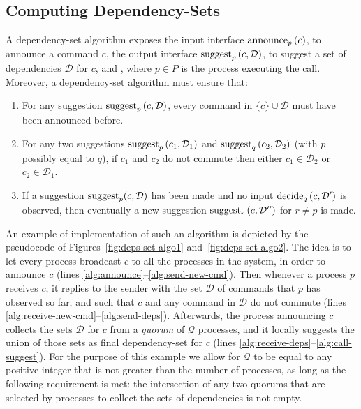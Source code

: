 

\subsection{Computing Dependency-Sets}
\label{dep-algo}


A dependency-set algorithm exposes the input interface $\operatorname{announce}_p\left( c \right)$, to announce a command $c$, the output interface $\operatorname{suggest}_p \left( c,\mathcal{D}\right)$, to suggest a set of dependencies $\mathcal{D}$ for $c$, and , where $p\in P$ is the process executing the call.
Moreover, a dependency-set algorithm must ensure that:
\begin{enumerate}
    \item For any suggestion $\operatorname{suggest}_p \left( c,\mathcal{D}\right)$, every command in $\{c\}\cup \mathcal{D}$ must have been announced before.
    \item For any two suggestions $\operatorname{suggest}_p \left( c_1,\mathcal{D}_1\right)$ and $\operatorname{suggest}_q \left( c_2,\mathcal{D}_2\right)$ (with $p$ possibly equal to $q$), if $c_1$ and $c_2$ do not commute then either $c_1\in \mathcal{D}_2$ or $c_2 \in \mathcal{D}_1$.
    \item If a suggestion $\operatorname{suggest}_p(c,\mathcal{D})$ has been made and no input $\operatorname{decide}_q\left( c,\mathcal{D'} \right)$ is observed, then eventually a new suggestion $\operatorname{suggest}_r\left( c,\mathcal{D''} \right)$ for $r\neq p$ is made.
\end{enumerate}

An example of implementation of such an algorithm is depicted by the pseudocode of Figures~\ref{fig:deps-set-algo1} and~\ref{fig:deps-set-algo2}. The idea is to let every process broadcast $c$ to all the processes in the system, in order to announce $c$ (lines \ref{alg:announce}--\ref{alg:send-new-cmd}). Then whenever a process $p$ receives $c$, it replies to the sender with the set $\mathcal{D}$ of commands that $p$ has observed so far, and such that $c$ and any command in $\mathcal{D}$ do not commute (lines \ref{alg:receive-new-cmd}--\ref{alg:send-deps}). Afterwards, the process announcing $c$ collects the sets $\mathcal{D}$ for $c$ from a \textit{quorum} of $\mathcal{Q}$ processes, and it locally suggests the union of those sets as final dependency-set for $c$ (lines \ref{alg:receive-deps}--\ref{alg:call-suggest}). For the purpose of this example we allow for $\mathcal{Q}$ to be equal to any positive integer that is not greater than the number of processes, as long as the following requirement is met: the intersection of any two quorums that are selected by processes to collect the sets of dependencies is not empty.

